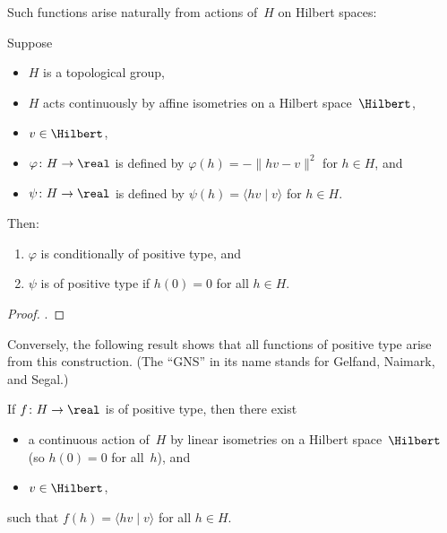 Such functions arise naturally from actions of~$H$ on Hilbert spaces:

\begin{lem} \label{PosTypeFromAction}
Suppose
\noprelistbreak
	\begin{itemize}
	\item $H$ is a topological group,
	\item $H$ acts continuously by affine isometries on a Hilbert space~$\Hilbert$,
	\item $v \in \Hilbert$,
	\item $\varphi \colon H \to \real$ is defined by $\varphi(h) = -\| hv - v \|^2$ for $h \in H$,
	and
	\item $\psi \colon H \to \real$ is defined by $\psi(h) = \langle hv \mid v \rangle$ for $h \in H$.
	\end{itemize}
Then:
	\begin{enumerate}
	\item  \label{PosTypeFromAction-Cond}
	$\varphi$ is conditionally of positive type,
	and
	\item  \label{PosTypeFromAction-Pos}
	$\psi$ is of positive type if $h(0) = 0$ for all $h \in H$.
	\end{enumerate}
\end{lem} 

\begin{proof}
.
\end{proof}

Conversely, the following result shows that all functions of positive type arise from this construction. 
(The ``GNS'' in its name stands for Gelfand, Naimark, and Segal.) 

\begin{prop} \label{GNS}
If $f \colon H \to \real$ is of positive type, then there exist
\noprelistbreak
	\begin{itemize}
	\item a continuous action of~$H$ by linear isometries on a Hilbert space~$\Hilbert$ {\rm(}so $h(0) = 0$ for all~$h${\rm)},
	and
	\item $v \in \Hilbert$,
	\end{itemize}
such that $f(h) = \langle hv \mid v \rangle$ for all $h \in H$.
\end{prop}

